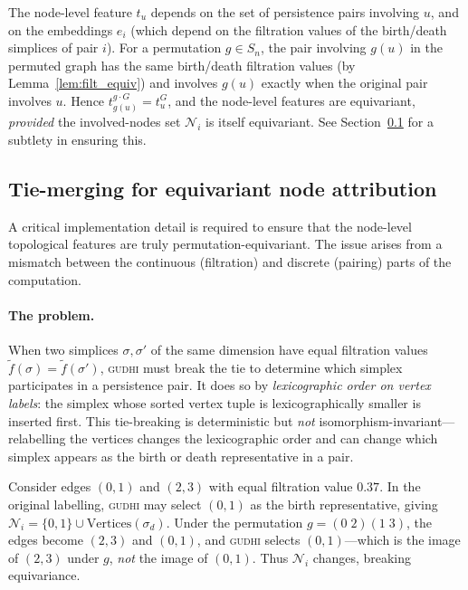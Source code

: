 \begin{remark}
The node-level feature $t_u$ depends on the set of persistence pairs involving $u$, and on the embeddings $e_i$ (which depend on the filtration values of the birth/death simplices of pair $i$). For a permutation $g \in S_n$, the pair involving $g(u)$ in the permuted graph has the same birth/death filtration values (by Lemma~\ref{lem:filt_equiv}) and involves $g(u)$ exactly when the original pair involves $u$. Hence $t_{g(u)}^{g \cdot G} = t_u^G$, and the node-level features are equivariant, \emph{provided} the involved-nodes set $\mathcal{N}_i$ is itself equivariant. See Section~\ref{sec:tie_merging} for a subtlety in ensuring this.
\end{remark}


\subsection{Tie-merging for equivariant node attribution}
\label{sec:tie_merging}

A critical implementation detail is required to ensure that the node-level topological features are truly permutation-equivariant. The issue arises from a mismatch between the continuous (filtration) and discrete (pairing) parts of the computation.

\paragraph{The problem.}
When two simplices $\sigma, \sigma'$ of the same dimension have equal filtration values $\tilde{f}(\sigma) = \tilde{f}(\sigma')$, \textsc{gudhi} must break the tie to determine which simplex participates in a persistence pair. It does so by \emph{lexicographic order on vertex labels}: the simplex whose sorted vertex tuple is lexicographically smaller is inserted first. This tie-breaking is deterministic but \emph{not} isomorphism-invariant---relabelling the vertices changes the lexicographic order and can change which simplex appears as the birth or death representative in a pair.

\begin{example}
Consider edges $(0,1)$ and $(2,3)$ with equal filtration value $0.37$. In the original labelling, \textsc{gudhi} may select $(0,1)$ as the birth representative, giving $\mathcal{N}_i = \{0,1\} \cup \mathrm{Vertices}(\sigma_d)$. Under the permutation $g = (0\;2)(1\;3)$, the edges become $(2,3)$ and $(0,1)$, and \textsc{gudhi} selects $(0,1)$---which is the image of $(2,3)$ under $g$, \emph{not} the image of $(0,1)$. Thus $\mathcal{N}_i$ changes, breaking equivariance.
\end{example}

